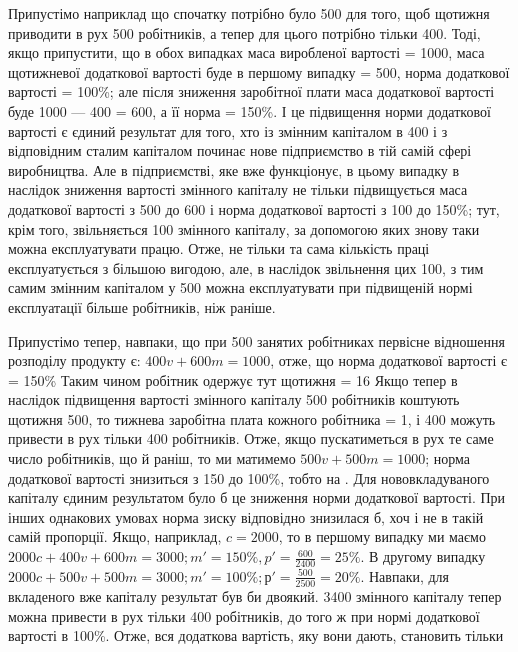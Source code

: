 
Припустімо наприклад що спочатку потрібно було 500 для того, щоб щотижня приводити в рух 500 робітників, а тепер для цього потрібно тільки
400.
Тоді, якщо припустити, що в обох випадках маса виробленої
вартості = 1000, маса щотижневої додаткової вартості буде в першому випадку = 500, норма додаткової вартості  = 100\%; але після зниження заробітної плати
маса додаткової вартості буде 1000 — 400 = 600, а її норма  = 150\%. І це підвищення норми додаткової вартості є єдиний результат
для того, хто із змінним капіталом в 400 і з відповідним сталим капіталом починає
нове підприємство в тій самій сфері виробництва. Але в підприємстві, яке вже функціонує, в цьому
випадку в наслідок зниження вартості змінного
капіталу не тільки підвищується маса додаткової вартості з 500
до 600 і норма додаткової вартості з 100
до 150\%; тут, крім того, звільняється 100
змінного капіталу, за допомогою яких знову таки можна експлуатувати працю. Отже, не тільки та сама
кількість праці експлуатується з більшою вигодою, але, в наслідок звільнення цих 100, з тим самим змінним капіталом у 500 можна експлуатувати при підвищеній
нормі експлуатації більше робітників, ніж раніше.

Припустімо тепер, навпаки, що при 500 занятих робітниках
первісне відношення розподілу продукту є: $400 v + 600 m = 1000$, отже, що норма додаткової вартості є
= 150\% Таким
чином робітник одержує тут щотижня  = 16 Якщо тепер в наслідок
підвищення вартості
змінного капіталу 500 робітників коштують щотижня 500, то тижнева заробітна плата кожного робітника = 1, і 400 можуть привести
в рух тільки 400 робітників. Отже, якщо пускатиметься в рух те
саме число робітників, що й раніш, то ми матимемо $500 v + 500 m = 1000$; норма додаткової вартості
знизиться з 150 до 100\%,
тобто на . Для нововкладуваного капіталу єдиним результатом було б це зниження норми додаткової
вартості. При інших
однакових умовах норма зиску відповідно знизилася б, хоч і не
в такій самій пропорції. Якщо, наприклад, $c = 2000$, то в
першому випадку ми маємо $2000 c + 400 v + 600 m = 3000; m' = 150\%, p' = \frac{600}{2400} = 25\%$. В другому
випадку $2000 c + 500 v + 500 m = 3000; m' = 100\%; р' = \frac{500}{2500} = 20\%$. Навпаки, для вкладеного вже
капіталу результат був би двоякий. 3400 змінного капіталу тепер можна привести в рух тільки
400 робітників, до того ж при нормі додаткової вартості в 100\%.
Отже, вся додаткова вартість, яку вони дають, становить тільки
\parbreak{}  %
